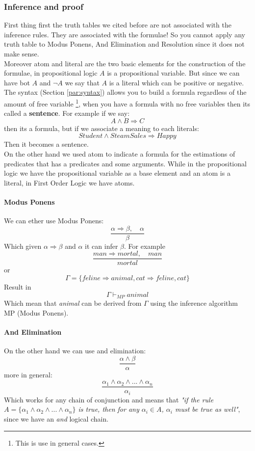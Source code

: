 \documentclass[10pt,a4paper]{article}
\begin{document}
\subsubsection{Inference and proof}
\label{subsec:modusPonens}

First thing first the truth tables we cited before are not associated with the inference rules. They are associated with the formulae! So you cannot apply any truth table to Modus Ponens, And Elimination and Resolution since it does not make sense.\\

Moreover atom and literal are the two basic elements for the construction of the formulae, in propositional logic $A$ is a propositional variable. But since we can have bot $A$ and $\neg A$ we say that $A$ is a literal which can be positive or negative.\\

The syntax (Section \ref{par:syntax}) allows you to build a formula regardless of the amount of free variable \footnote{This is use in general cases.}, when you have a formula with no free variables then its called a \textbf{sentence}. For example if we say:
\[A\wedge B \Rightarrow C\]
then its a formula, but if we associate a meaning to each literals:
\[Student \wedge SteamSales \Rightarrow Happy\]
Then it becomes a sentence.\\

On the other hand we used atom to indicate a formula for the estimations of predicates that has a predicates and some arguments. While in the propositional logic we have the propositional variable as a base element and an atom is a literal, in First Order Logic we have atoms.


\paragraph{Modus Ponens} We can ether use Modus Ponens:
\[\frac{\alpha \Rightarrow \beta,\quad \alpha}{\beta}\]
Which given $\alpha \Rightarrow \beta$ and $\alpha$ it can infer $\beta$. For example
\[\frac{man \Rightarrow mortal,\quad man}{mortal}\]
or
\[\Gamma =\lbrace feline \Rightarrow animal, cat \Rightarrow feline, cat \rbrace\]
Result in 
\[\Gamma \vdash_{MP} animal\]
Which mean that \textit{animal} can be derived from $\Gamma$ using the inference algorithm MP (Modus Ponens).\\

\paragraph{And Elimination}On the other hand we can use and elimination:
\[\frac{\alpha\wedge\beta}{\alpha}\]
more in general:
\[\frac{\alpha_1\wedge\alpha_2\wedge...\wedge \alpha_n}{\alpha_i}\]
Which works for any chain of conjunction and means that \textit{"if the rule $A=\lbrace\alpha_1\wedge\alpha_2\wedge...\wedge \alpha_n\rbrace$ is true, then for any $\alpha_i \in A$, $\alpha_i$ must be true as well"}, since we have an \textit{and} logical chain.\\
\end{document}
